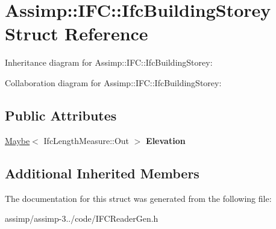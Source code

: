 \hypertarget{struct_assimp_1_1_i_f_c_1_1_ifc_building_storey}{\section{Assimp\+:\+:I\+F\+C\+:\+:Ifc\+Building\+Storey Struct Reference}
\label{struct_assimp_1_1_i_f_c_1_1_ifc_building_storey}
}


Inheritance diagram for Assimp\+:\+:I\+F\+C\+:\+:Ifc\+Building\+Storey\+:


Collaboration diagram for Assimp\+:\+:I\+F\+C\+:\+:Ifc\+Building\+Storey\+:
\subsection*{Public Attributes}
\begin{DoxyCompactItemize}
\item 
\hypertarget{struct_assimp_1_1_i_f_c_1_1_ifc_building_storey_a9b34dcd7fa26a4f859303da4c7b6152c}{\hyperlink{struct_assimp_1_1_s_t_e_p_1_1_maybe}{Maybe}$<$ Ifc\+Length\+Measure\+::\+Out $>$ {\bfseries Elevation}}\label{struct_assimp_1_1_i_f_c_1_1_ifc_building_storey_a9b34dcd7fa26a4f859303da4c7b6152c}

\end{DoxyCompactItemize}
\subsection*{Additional Inherited Members}


The documentation for this struct was generated from the following file\+:\begin{DoxyCompactItemize}
\item 
assimp/assimp-\/3../code/I\+F\+C\+Reader\+Gen.\+h\end{DoxyCompactItemize}
